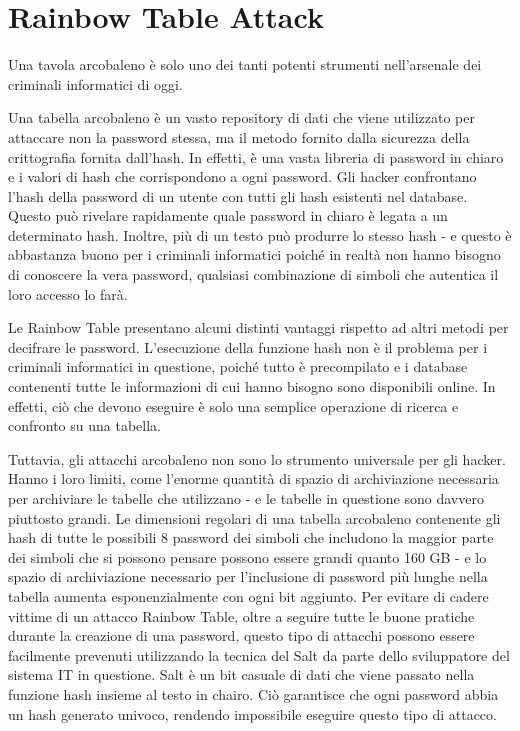 \section{Rainbow Table Attack}
Una tavola arcobaleno \cite{Rainbow_table_attack} è solo uno dei tanti potenti strumenti nell'arsenale dei criminali informatici di oggi.

Una tabella arcobaleno è un vasto repository di dati che viene utilizzato per attaccare non la password stessa, ma il metodo fornito dalla sicurezza della crittografia fornita dall'hash. In effetti, è una vasta libreria di password in chiaro e i valori di hash che corrispondono a ogni password. Gli hacker confrontano l'hash della password di un utente con tutti gli hash esistenti nel database. Questo può rivelare rapidamente quale password in chiaro è legata a un determinato hash. Inoltre, più di un testo può produrre lo stesso hash - e questo è abbastanza buono per i criminali informatici poiché in realtà non hanno bisogno di conoscere la vera password, qualsiasi combinazione di simboli che autentica il loro accesso lo farà.

Le Rainbow Table presentano alcuni distinti vantaggi rispetto ad altri metodi per decifrare le password. L'esecuzione della funzione hash non è il problema per i criminali informatici in questione, poiché tutto è precompilato e i database contenenti tutte le informazioni di cui hanno bisogno sono disponibili online. In effetti, ciò che devono eseguire è solo una semplice operazione di ricerca e confronto su una tabella.

Tuttavia, gli attacchi arcobaleno non sono lo strumento universale per gli hacker. Hanno i loro limiti, come l'enorme quantità di spazio di archiviazione necessaria per archiviare le tabelle che utilizzano - e le tabelle in questione sono davvero piuttosto grandi. Le dimensioni regolari di una tabella arcobaleno contenente gli hash di tutte le possibili 8 password dei simboli che includono la maggior parte dei simboli che si possono pensare possono essere grandi quanto 160 GB - e lo spazio di archiviazione necessario per l'inclusione di password più lunghe nella tabella aumenta esponenzialmente con ogni bit aggiunto.
Per evitare di cadere vittime di un attacco Rainbow Table, oltre a seguire tutte le buone pratiche durante la creazione di una password, questo tipo di attacchi possono essere facilmente prevenuti utilizzando la tecnica del Salt da parte dello sviluppatore del sistema IT in questione. Salt è un bit casuale di dati che viene passato nella funzione hash insieme al testo in chairo. Ciò garantisce che ogni password abbia un hash generato univoco, rendendo impossibile eseguire questo tipo di attacco.

